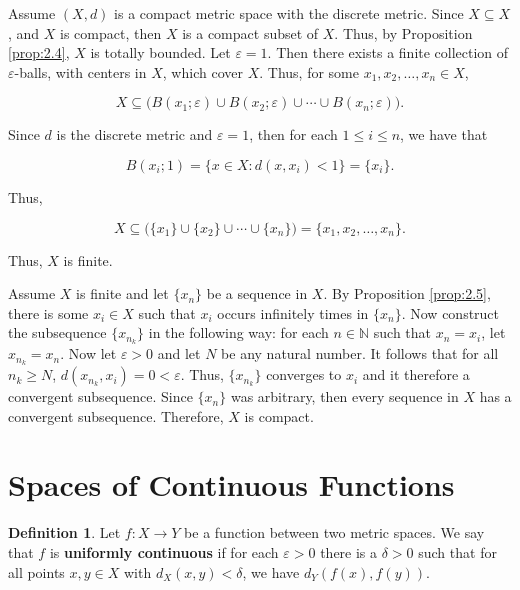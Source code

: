 \documentclass{article}
\makeatletter
\theoremstyle{definition}
\newtheorem{definition}{Definition}[section]
\theoremstyle{remark}
\let\oldproofname=\proofname
\renewcommand{\proofname}{\bf{\textit{\oldproofname}}}
\theoremstyle{definition}
\renewenvironment{proof}[1][\proofname]{\par
  \pushQED{\qed}%
  \normalfont \topsep6\p@\@plus6\p@\relax
  \list{}{\leftmargin=0mm
          \rightmargin=0mm
          \settowidth{\itemindent}{\itshape#1}%
          \labelwidth=\itemindent
          \parsep=0pt \listparindent=0mm%
  }
  \item[\hskip\labelsep
        \itshape
    #1\@addpunct{.}]\ignorespaces
}{%
  \popQED\endlist\@endpefalse
}
\makeatother
\begin{document}
\begin{proof}
    Assume $(X,d)$ is a compact metric space with the discrete metric. Since $X\subseteq X$, and $X$ is compact, then $X$ is a compact subset of $X$. Thus, by Proposition \ref{prop:2.4}, $X$ is totally bounded. Let $\varepsilon=1$. Then there exists a finite collection of $\varepsilon$-balls, with centers in $X$, which cover $X$. Thus, for some $x_1,x_2,\dots,x_n\in X$, 
    
    \begin{equation*}
        X\subseteq\big(B(x_1;\varepsilon)\cup B(x_2;\varepsilon)\cup\cdots\cup B(x_n;\varepsilon)\big).
    \end{equation*}
    
    Since $d$ is the discrete metric and $\varepsilon=1$, then for each $1\leq i\leq n$, we have that 
    
    \begin{equation*}
        B(x_i;1)=\{x\in X\colon d(x,x_i)<1\}=\{x_i\}.
    \end{equation*}
    
    Thus, 
    
    \begin{equation*}
        X\subseteq\big(\{x_1\}\cup\{x_2\}\cup\cdots\cup\{x_n\}\big)=\{x_1,x_2,\dots,x_n\}.
    \end{equation*}
    
    Thus, $X$ is finite.\par\hspace{4mm} Assume $X$ is finite and let $\{x_n\}$ be a sequence in $X$. By Proposition \ref{prop:2.5}, there is some $x_i\in X$ such that $x_i$ occurs infinitely times in $\{x_n\}$. Now construct the subsequence $\{x_{n_k}\}$ in the following way: for each $n\in\mathbb{N}$ such that $x_n=x_i$, let $x_{n_k}=x_n$. Now let $\varepsilon>0$ and let $N$ be any natural number. It follows that for all $n_k\geq N$, $d(x_{n_k}, x_i)=0<\varepsilon$. Thus, $\{x_{n_k}\}$ converges to $x_i$ and it therefore a convergent subsequence. Since $\{x_n\}$ was arbitrary, then every sequence in $X$ has a convergent subsequence. Therefore, $X$ is compact.
\end{proof}

\newpage

\section{Spaces of Continuous Functions}

\begin{definition} \label{df:3.1}
    Let $f\colon X\rightarrow Y$ be a function between two metric spaces. We say that $f$ is \textbf{uniformly continuous} if for each $\varepsilon>0$ there is a $\delta>0$ such that for all points $x,y\in X$ with $d_X(x,y)<\delta$, we have $d_Y(f(x),f(y))$.
\end{definition}
\end{document}
